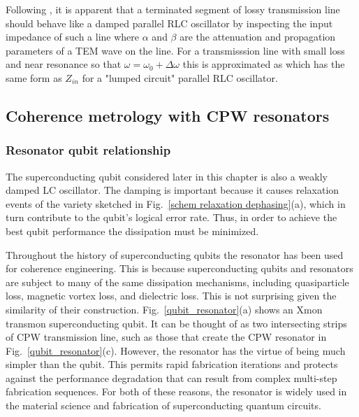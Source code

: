 Following  \cite{Pozar}, it is apparent that a terminated segment of lossy transmission line should behave like a damped parallel RLC oscillator by inspecting the input impedance of such a line
where $\alpha$ and $\beta$ are the attenuation and propagation parameters of a TEM wave on the line.
For a transmisssion line with small loss and near resonance so that $\omega = \omega_0 + \Delta \omega$ this is approximated as
which has the same form as $Z_{in}$ for a "lumped circuit" parallel RLC oscillator.

\subsection{Coherence metrology with CPW resonators}

\subsubsection{Resonator qubit relationship}

The superconducting qubit considered later in this chapter is also a weakly damped LC oscillator.
The damping is important because it causes relaxation events of the variety sketched in Fig.~\ref{schem relaxation dephasing}(a),
which in turn contribute to the qubit's logical error rate.
Thus, in order to achieve the best qubit performance the dissipation must be minimized.

Throughout the history of superconducting qubits the resonator has been used for coherence engineering.
This is because superconducting qubits and resonators are subject to many of the same dissipation mechanisms,
including quasiparticle loss, magnetic vortex loss, and dielectric loss.
This is not surprising given the similarity of their construction.
Fig.~\ref{qubit_resonator}(a) shows an Xmon transmon superconducting qubit.
It can be thought of as two intersecting strips of CPW transmission line,
such as those that create the CPW resonator in Fig.~\ref{qubit_resonator}(c).
However, the resonator has the virtue of being much simpler than the qubit.
This permits rapid fabrication iterations and protects against the performance degradation that can result from complex multi-step fabrication sequences.
For both of these reasons, the resonator is widely used in the material science and fabrication of superconducting quantum circuits.

